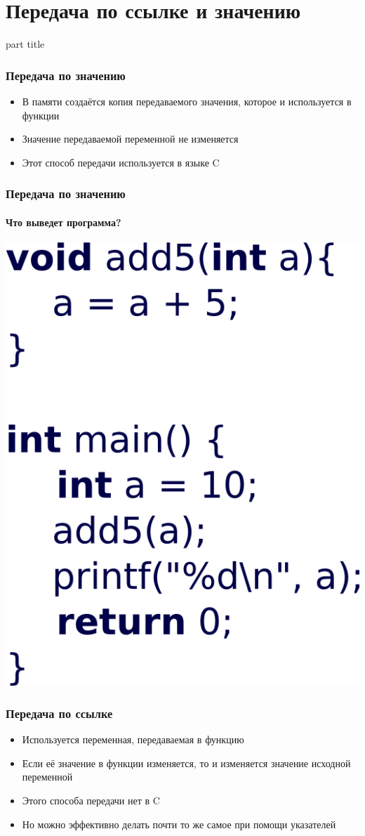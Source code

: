 \documentclass[14pt,pdf,hyperref={unicode}]{beamer}
\begin{document}
\section{Передача по ссылке и значению}
\begin{frame}
\begin{center}
\begin{beamercolorbox}[sep=8pt,center]{part
title}
\insertsection
\end{beamercolorbox}
\end{center}
\end{frame}

\begin{frame}[fragile]
\frametitle{Передача по значению} 
\begin{itemize}
\item В памяти создаётся копия передаваемого значения, которое и используется в функции
\item Значение передаваемой переменной не изменяется
\item Этот способ передачи используется в языке C
\end{itemize}
\end{frame}

\begin{frame}[fragile]
\frametitle{Передача по значению} 
\framesubtitle{Что выведет программа?} 
\begin{center}
\includegraphics[width=0.4\linewidth]{images/function_passvalue.png}
\end{center}
\end{frame}

\begin{frame}[fragile]
\frametitle{Передача по ссылке} 
\begin{itemize}
\item Используется переменная, передаваемая в функцию
\item Если её значение в функции изменяется, то и изменяется значение исходной переменной
\item Этого способа передачи нет в C
\item Но можно эффективно делать почти то же самое при помощи указателей
\end{itemize}
\end{frame}
\end{document}
